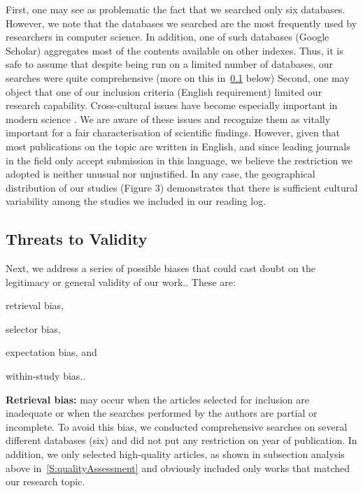 \documentclass[11pt]{article}
\newenvironment{paraenum}{\begin{inparaenum}[\itshape a)\upshape]}{\end{inparaenum}}
\begin{document}
First, one may see as problematic the fact that we searched only six databases. However, we note that the databases we searched are the most frequently used by researchers in computer science. In addition, one of such databases (Google Scholar) aggregates most of the contents available on other indexes. Thus, it is safe to assume that despite being run on a limited number of databases, our searches were quite comprehensive (more on this in~\cref{S:threats} below)
Second, one may object that one of our inclusion criteria (English requirement) limited our research capability. Cross-cultural issues have become especially important in modern science . We are aware of these issues and recognize them as vitally important for a fair characterisation of scientific findings. However, given that most publications on the topic are written in English, and since leading journals in the field only accept submission in this language, we believe the restriction we adopted is neither unusual nor unjustified. In any case, the geographical distribution of our studies (Figure 3) demonstrates that there is sufficient cultural variability among the studies we included in our reading log.

\subsection{Threats to Validity}\label{S:threats}

Next, we address a series of possible biases that could cast doubt on the legitimacy or general validity of our work.. These are:
\begin{paraenum}
\item retrieval bias,
\item selector bias,
\item expectation bias, and
\item within-study bias..
\end{paraenum}

\textbf{Retrieval bias:} may occur when the articles selected for inclusion are inadequate or when the searches performed by the authors are partial or incomplete. To avoid this bias, we conducted comprehensive searches on several different databases (six) and did not put any restriction on year of publication. In addition, we only selected high-quality articles, as shown in subsection analysis above in~\cref{S:qualityAssessment} and obviously included only works that matched our research topic.
\end{document}
